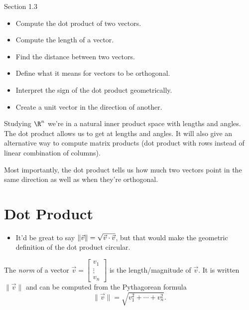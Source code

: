 \documentclass{problemset}
\newcommand{\matc}[1]{\begin{bmatrix}#1\end{bmatrix}}
\DeclarePairedDelimiter\norm{\lVert}{\rVert}
\begin{document}
\begin{lesson}

	Section 1.3

	\begin{itemize}
		\item Compute the dot product of two vectors.
		\item Compute the length of a vector.
		\item Find the distance between two vectors.
		\item Define what it means for vectors to be orthogonal.
		\item Interpret the sign of the dot product geometrically.
		\item Create a unit vector in the direction of another.
	\end{itemize}

	Studying $\R^n$ we're in a natural inner product space with lengths and
	angles. The dot product allows us to get at lengths and angles. It will
	also give an alternative way to compute matrix products (dot product with rows
	instead of linear combination of columns).

	Most importantly, the dot product tells us how much two vectors point in
	the same direction as well as when they're orthogonal.

\end{lesson}


\section*{Dot Product}
	\begin{annotation}
		\begin{notes}
			\begin{itemize}
				\item It'd be great to say $\norm{\vec v}=\sqrt{\vec v\cdot \vec v}$,
					but that would make the geometric definition of the dot product circular.
			\end{itemize}
		\end{notes}
	\end{annotation}
	\begin{definition}[Norm]
		The \emph{norm} of a vector $\vec v=\matc{v_1\\\vdots\\v_n}$ is the
		length/magnitude of $\vec v$. It is written $\|\vec v\|$ and can be computed from
		the Pythagorean formula
		\[
			\|\vec v\|=\sqrt{v_1^2+\cdots +v_n^2}.
		\]
	\end{definition}
\end{document}
